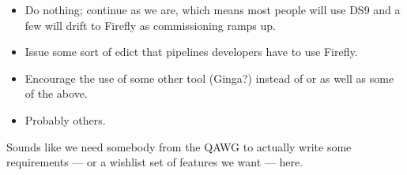 \begin{itemize}

  \item{Do nothing; continue as we are, which means most people will use DS9
  and a few will drift to Firefly as commissioning ramps up.}

  \item{Issue some sort of edict that pipelines developers have to use
  Firefly.}

  \item{Encourage the use of some other tool (Ginga?) instead of or as well as
  some of the above.}

  \item{Probably others.}

\end{itemize}

Sounds like we need somebody from the QAWG to actually write some requirements
--- or a wishlist set of features we want --- here.
